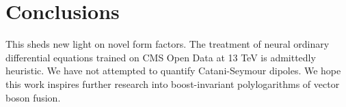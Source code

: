 \section{Conclusions}\label{sec:conclusions}

This sheds new light on novel form factors. The treatment of neural
ordinary differential equations trained on CMS Open Data at 13 TeV is
admittedly heuristic. We have not attempted to quantify Catani-Seymour
dipoles. We hope this work inspires further research into
boost-invariant polylogarithms of vector boson fusion.

